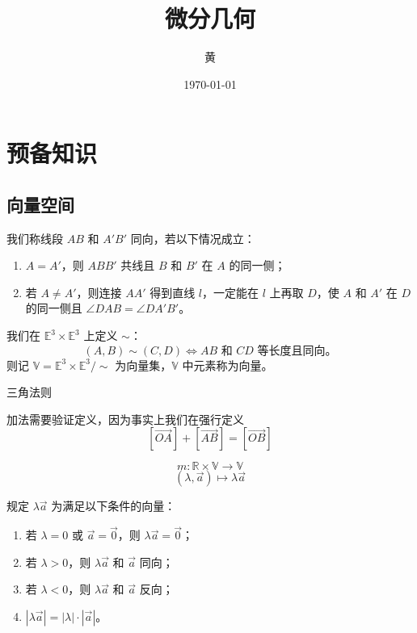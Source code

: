 \documentclass[lang=cn,10pt,thmcnt=section]{elegantbook}
\title{微分几何}
\author{黄}
\date{\today}
\begin{document}
	
	\maketitle
	\frontmatter
	
	\tableofcontents
	
	\mainmatter
\chapter{预备知识}
\section{向量空间}
\begin{definition}[同向]
    我们称线段 $AB$ 和 $A'B'$ 同向，若以下情况成立：
    \begin{enumerate}
        \item $A = A'$，则 $ABB'$ 共线且 $B$ 和 $B'$ 在 $A$ 的同一侧；
        \item 若 $A \neq A'$，则连接 $AA'$ 得到直线 $l$，一定能在 $l$ 上再取 $D$，使 $A$ 和 $A'$ 在 $D$ 的同一侧且 $\angle DAB = \angle DA'B'$。
    \end{enumerate}
\end{definition}

\begin{definition}[向量集]
    我们在 $\mathbb{E}^3 \times \mathbb{E}^3$ 上定义 $\sim$：
    \[
    (A, B) \sim (C, D) \iff AB \text{ 和 } CD \text{ 等长度且同向。}
    \]
    则记 $\mathbb{V} = \mathbb{E}^3 \times \mathbb{E}^3 / \sim$ 为向量集，$\mathbb{V}$ 中元素称为向量。
\end{definition}
\begin{definition}[加法]
 三角法则
\end{definition}

\begin{remark}
    加法需要验证定义，因为事实上我们在强行定义
\[
[\overrightarrow{OA}] + [\overrightarrow{AB}] = [\overrightarrow{OB}]
\]
\end{remark}
\begin{definition}[数乘]
    \[
m : \mathbb{R} \times \mathbb{V} \rightarrow \mathbb{V}
\]
\[
(\lambda, \vec{a}) \mapsto \lambda \vec{a}
\]
\end{definition}

\begin{definition}
    规定 $\lambda \vec{a}$ 为满足以下条件的向量：
    \begin{enumerate}
        \item 若 $\lambda = 0$ 或 $\vec{a} = \vec{0}$，则 $\lambda \vec{a} = \vec{0}$；
        \item 若 $\lambda > 0$，则 $\lambda \vec{a}$ 和 $\vec{a}$ 同向；
        \item 若 $\lambda < 0$，则 $\lambda \vec{a}$ 和 $\vec{a}$ 反向；
        \item $|\lambda \vec{a}| = |\lambda| \cdot |\vec{a}|$。
    \end{enumerate}
\end{definition}
\end{document}
